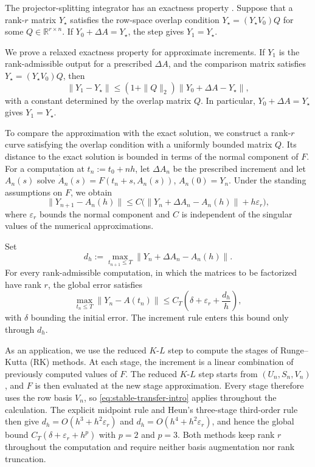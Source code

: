 \documentclass[]{article}
\numberwithin{equation}{section}
\theoremstyle{plain}
\theoremstyle{remark}
\numberwithin{algorithm}{section}
\newcommand{\R}{\mathbb{R}}
\newcommand{\eps}{\varepsilon}
\begin{document}
The projector-splitting integrator has an exactness property
\cite{LubichOseledets2014}.  Suppose that a rank-\(r\) matrix
\(Y_\star\) satisfies the row-space overlap condition
\(Y_\star=(Y_\star V_0)Q\) for some \(Q\in\R^{r\times n}\).
If \(Y_0+\Delta A=Y_\star\), the step gives \(Y_1=Y_\star\).

We prove a relaxed exactness property for approximate increments.  If \(Y_1\)
is the rank-admissible output for a prescribed \(\Delta A\), and the
comparison matrix satisfies \(Y_\star=(Y_\star V_0)Q\), then
\begin{equation}\label{eq:stable-exactness-intro}
 \|Y_1-Y_\star\|\le(1+\|Q\|_2)\|Y_0+\Delta A-Y_\star\|,
\end{equation}
with a constant determined by the overlap matrix \(Q\).  In particular,
\(Y_0+\Delta A=Y_\star\) gives \(Y_1=Y_\star\).

To compare the approximation with the exact solution, we construct a
rank-\(r\) curve satisfying the overlap condition with a uniformly bounded
matrix \(Q\).  Its distance to the exact solution is bounded in terms of
the normal component of \(F\).
For a computation at \(t_n:=t_0+nh\), let \(\Delta A_n\) be the prescribed
increment and let \(A_n(s)\) solve
\(\dot A_n(s)=F(t_n+s,A_n(s))\), \(A_n(0)=Y_n\).
Under the standing assumptions on \(F\), we obtain
\begin{equation}\label{eq:stable-transfer-intro}
 \|Y_{n+1}-A_n(h)\|
 \le C\bigl(\|Y_n+\Delta A_n-A_n(h)\|+h\eps_r\bigr),
\end{equation}
where \(\eps_r\) bounds the normal component and \(C\) is independent of the
singular values of the numerical approximations.

Set
\begin{equation}\label{eq:increment-defect-intro}
 d_h:=\max_{t_{n+1}\le T}\|Y_n+\Delta A_n-A_n(h)\|.
\end{equation}
For every rank-admissible computation, in which the matrices to be
factorized have rank \(r\), the global error satisfies
\begin{equation}\label{eq:general-global-intro}
 \max_{t_n\le T}\|Y_n-A(t_n)\|
 \le C_T\left(\delta+\eps_r+\frac{d_h}{h}\right),
\end{equation}
with \(\delta\) bounding the initial error.  The increment rule enters this
bound only through \(d_h\).

As an application, we use the reduced \(K\)-\(L\) step to compute the stages of
Runge--Kutta (RK) methods.  At each stage, the increment is a linear combination
of previously computed values of \(F\).  The reduced \(K\)-\(L\) step starts
from \((U_n,S_n,V_n)\), and \(F\) is then evaluated at the new stage
approximation.  Every stage therefore uses the row basis \(V_n\), so
\eqref{eq:stable-transfer-intro} applies throughout the calculation.  The explicit
midpoint rule and Heun's three-stage third-order rule then give
\(d_h=O(h^3+h^2\eps_r)\) and \(d_h=O(h^4+h^2\eps_r)\), and hence the global
bound \(C_T(\delta+\eps_r+h^p)\) with \(p=2\) and \(p=3\).
Both methods keep rank \(r\) throughout the computation and require
neither basis augmentation nor rank truncation.
\end{document}

